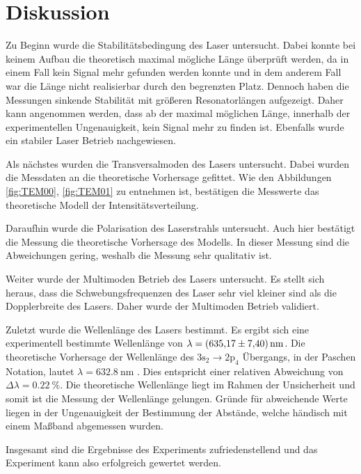 \chapter{Diskussion}
\label{cha:Diskussion}
Zu Beginn wurde die Stabilitätsbedingung des Laser untersucht. Dabei konnte bei keinem Aufbau die theoretisch maximal mögliche Länge überprüft werden, da in einem Fall kein Signal mehr
gefunden werden konnte und in dem anderem Fall war die Länge nicht realisierbar durch den begrenzten Platz. Dennoch haben die Messungen sinkende Stabilität mit größeren 
Resonatorlängen aufgezeigt. Daher kann angenommen werden, dass ab der maximal möglichen Länge, innerhalb der experimentellen Ungenauigkeit, kein Signal mehr zu finden ist. 
Ebenfalls wurde ein stabiler Laser Betrieb nachgewiesen. 

Als nächstes wurden die Transversalmoden des Lasers untersucht. Dabei wurden die Messdaten an die theoretische Vorhersage gefittet. Wie den Abbildungen \ref{fig:TEM00}, \ref{fig:TEM01}
zu entnehmen ist, bestätigen die Messwerte das theoretische Modell der Intensitätsverteilung.

Daraufhin wurde die Polarisation des Laserstrahls untersucht. Auch hier bestätigt die Messung die theoretische Vorhersage des Modells. In dieser Messung sind die Abweichungen gering, 
weshalb die Messung sehr qualitativ ist.

Weiter wurde der Multimoden Betrieb des Lasers untersucht. Es stellt sich heraus, dass die Schwebungsfrequenzen des Laser sehr viel kleiner sind als die Dopplerbreite des Lasers. 
Daher wurde der Multimoden Betrieb validiert. 

Zuletzt wurde die Wellenlänge des Lasers bestimmt. Es ergibt sich eine experimentell bestimmte Wellenlänge von $\lambda = \qty{635.17 +- 7.40}{\nano\metre}$. Die theoretische 
Vorhersage der Wellenlänge des $3\text{s}_2 \rightarrow 2\text{p}_4$ Übergangs, in der Paschen Notation, lautet $\lambda = \qty{632.8}{\nano\metre}$ \cite{Wikipedia_HeNe}.
Dies entspricht einer relativen Abweichung von $\Delta \lambda = \qty{0.22}{\percent}$. Die theoretische Wellenlänge liegt im Rahmen der Unsicherheit und somit ist die Messung 
der Wellenlänge gelungen. Gründe für abweichende Werte liegen in der Ungenauigkeit der Bestimmung der Abstände, welche händisch mit einem Maßband abgemessen wurden. 

Insgesamt sind die Ergebnisse des Experiments zufriedenstellend und das Experiment kann also erfolgreich gewertet werden.